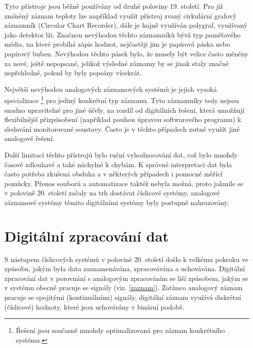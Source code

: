 Tyto přístroje jsou běžně používány od druhé poloviny 19. století. Pro již zmíněný záznam teploty lze například využít přístroj zvaný cirkulární grafový záznamník (Circular Chart Recorder), dále je hojně využíván polygraf, využívaný jako detektor lži. Značnou nevýhodou těchto záznamníků bývá typ paměťového média, na které probíhá zápis hodnot, nejčastěji jim je papírová páska nebo papírový buben. Nevýhodou těchto pásek bylo, že musely být velice často měněny za nové, ještě nepopsané, jelikož výsledné záznamy by se jinak staly značně nepřehledné, pokud by byly popsány vícekrát. \cite{origin_of_chart_recorders}

Největší nevýhodou analogových záznamových systémů je jejich vysoká specializace \footnote{Řešení jsou současně mnohdy optimalizovaná pro záznam konkrétního systému.} pro jediný konkrétní typ záznamu. Tyto záznamníky tedy nejsou snadno upravitelné pro jiné účely, na rozdíl od digitálních řešení, která umožňují flexibilnější přizpůsobení (například pouhou úpravou softwarového programu) k sledování monitorované soustavy. Často je v těchto případech nutné využít jiné analogové řešení. \cite{analog_signal_and_digital_signal_processing_Tel_System}

Další limitací těchto přístrojů bylo ruční vyhodnocování dat, což bylo mnohdy časově zdlouhavé a také náchylné k chybám. K správné interpretaci dat byla často potřeba zkušená obsluha a v některých případech i pomocné měřící pomůcky. Přenos souborů a automatizace taktéž nebyla možná, proto jakmile se v polovině 20. století začaly na trh dostávat číslicové systémy, analogové záznamové systémy těmito digitálními systémy byly postupně nahrazovány. \cite{newcastle_history_of_digital_computers, florian_prechod_a_analog_do_digital}


\section{Digitální zpracování dat}
\label{digitalni_zaznam_dat}
S nástupem číslicových systémů v polovině 20. století došlo k velkému pokroku ve způsobu, jakým byla data zaznamenávána, zpracovávána a uchovávána. Digitální zpracování dat v porovnání s analogovým zpracováním se liší způsobem, jakým se v systému obecně pracuje se signály (viz. \ref{zaznam}). Zatímco analogový záznam pracuje se spojitými (kontinuálními) signály, digitální záznam využívá diskrétní (číslicové) hodnoty, které jsou uchovávány v binární podobě.

